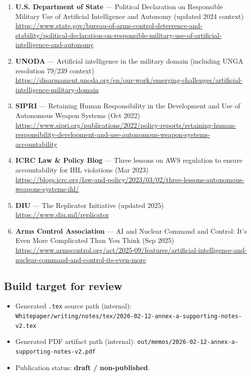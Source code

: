 \documentclass[
]{article}
\providecommand{\tightlist}{%
  \setlength{\itemsep}{0pt}\setlength{\parskip}{0pt}}
\begin{document}
\begin{enumerate}
  \textbf{UK MOD (GOV.UK)} --- Laying the Groundwork: Responsible AI
  Senior Officers' Report 2025 (Oct 2025)\\
  \url{https://www.gov.uk/government/publications/laying-the-groundwork-responsible-ai-senior-officers-report-2025}
\item
  \textbf{U.S. Department of State} --- Political Declaration on
  Responsible Military Use of Artificial Intelligence and Autonomy
  (updated 2024 context)\\
  \url{https://www.state.gov/bureau-of-arms-control-deterrence-and-stability/political-declaration-on-responsible-military-use-of-artificial-intelligence-and-autonomy}
\item
  \textbf{UNODA} --- Artificial intelligence in the military domain
  (including UNGA resolution 79/239 context)\\
  \url{https://disarmament.unoda.org/en/our-work/emerging-challenges/artificial-intelligence-military-domain}
\item
  \textbf{SIPRI} --- Retaining Human Responsibility in the Development
  and Use of Autonomous Weapon Systems (Oct 2022)\\
  \url{https://www.sipri.org/publications/2022/policy-reports/retaining-human-responsibility-development-and-use-autonomous-weapon-systems-accountability}
\item
  \textbf{ICRC Law \& Policy Blog} --- Three lessons on AWS regulation
  to ensure accountability for IHL violations (Mar 2023)\\
  \url{https://blogs.icrc.org/law-and-policy/2023/03/02/three-lessons-autonomous-weapons-systems-ihl/}
\item
  \textbf{DIU} --- The Replicator Initiative (updated 2025)\\
  \url{https://www.diu.mil/replicator}
\item
  \textbf{Arms Control Association} --- AI and Nuclear Command and
  Control: It's Even More Complicated Than You Think (Sep 2025)\\
  \url{https://www.armscontrol.org/act/2025-09/features/artificial-intelligence-and-nuclear-command-and-control-its-even-more}
\end{enumerate}

\hypertarget{build-target-for-review}{%
\subsection{Build target for review}\label{build-target-for-review}}

\begin{itemize}
\tightlist
\item
  Generated \texttt{.tex} source path (internal):
  \texttt{Whitepaper/writing/notes/tex/2026-02-12-annex-a-supporting-notes-v2.tex}
\item
  Generated PDF artifact path (internal):
  \texttt{out/memos/2026-02-12-annex-a-supporting-notes-v2.pdf}
\item
  Publication status: \textbf{draft / non-published}.
\end{itemize}
\end{document}
